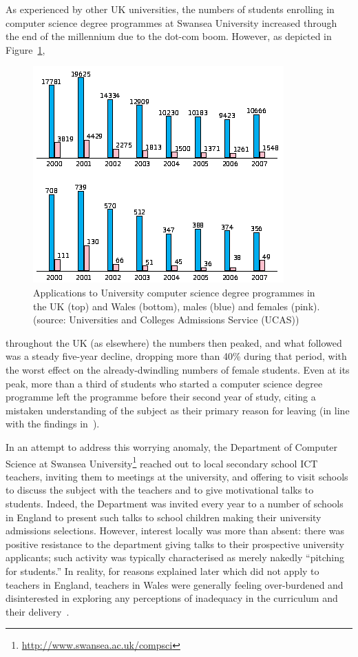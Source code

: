 \documentclass{sig-alternate}
\begin{document}
As experienced by other UK universities, the numbers of students
enrolling in computer science degree programmes at Swansea University
increased through the end of the millennium due to the dot-com boom.
However, as depicted in Figure~\ref{fig:numbers},
\begin{figure}%
  \centering
  \includegraphics[width=0.9\columnwidth]{images/numbers.png}
  \caption{Applications to University computer science degree programmes
           in the UK (top) and Wales (bottom), males (blue) and females (pink).
           (source: Universities and Colleges Admissions Service
           (UCAS))}
  \label{fig:numbers}
\end{figure}
throughout the UK
(as elsewhere) the numbers then peaked, and what followed was a steady
five-year decline, dropping more than 40\% during that period, with
the worst effect on the already-dwindling numbers of female students.
Even at its peak, more than a third of students who started a computer
science degree programme left the programme before their second year
of study, citing a mistaken understanding of the subject as their
primary reason for leaving
(in line with the findings in~\cite{brown-et-al-toce2014}).

In an attempt to address this worrying anomaly, the Department of
Computer Science at
Swansea University\footnote{\url{http://www.swansea.ac.uk/compsci}} reached out
to local secondary school ICT teachers, inviting them to meetings at
the university, and offering to visit schools to discuss the subject
with the teachers and to give motivational talks to students. Indeed,
the Department was invited every year to a number of schools in
England to present such talks to school children making their
university admissions selections.  However, interest locally was more
than absent: there was positive resistance to the department giving
talks to their prospective university applicants; such activity was
typically characterised as merely nakedly ``pitching for students.''
In reality, for reasons explained later which did not apply to
teachers in England, teachers in Wales were generally feeling
over-burdened and disinterested in exploring any perceptions of
inadequacy in the curriculum and their
delivery~\cite{crick+sentance:2011,boyle-et-al:2012,brown-et-al-toce2014}.
\end{document}
